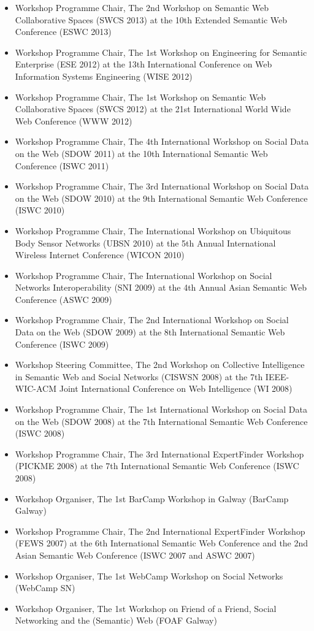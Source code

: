 \documentclass[10pt,a4paper]{res} %
\begin{document}
\begin{resume}
\begin{itemize}
\item Workshop Programme Chair, The 2nd Workshop on Semantic Web Collaborative Spaces (SWCS 2013) at the 10th Extended Semantic Web Conference (ESWC 2013)
\item Workshop Programme Chair, The 1st Workshop on Engineering for Semantic Enterprise (ESE 2012) at the 13th International Conference on Web Information Systems Engineering (WISE 2012)
\item Workshop Programme Chair, The 1st Workshop on Semantic Web Collaborative Spaces (SWCS 2012) at the 21st International World Wide Web Conference (WWW 2012)
\item Workshop Programme Chair, The 4th International Workshop on Social Data on the Web (SDOW 2011) at the 10th International Semantic Web Conference (ISWC 2011)
\item Workshop Programme Chair, The 3rd International Workshop on Social Data on the Web (SDOW 2010) at the 9th International Semantic Web Conference (ISWC 2010)
\item Workshop Programme Chair, The International Workshop on Ubiquitous Body Sensor Networks (UBSN 2010) at the 5th Annual International Wireless Internet Conference (WICON 2010)
\item Workshop Programme Chair, The International Workshop on Social Networks Interoperability (SNI 2009) at the 4th Annual Asian Semantic Web Conference (ASWC 2009)
\item Workshop Programme Chair, The 2nd International Workshop on Social Data on the Web (SDOW 2009) at the 8th International Semantic Web Conference (ISWC 2009)
\item Workshop Steering Committee, The 2nd Workshop on Collective Intelligence in Semantic Web and Social Networks (CISWSN 2008) at the 7th IEEE-WIC-ACM Joint International Conference on Web Intelligence (WI 2008)
\item Workshop Programme Chair, The 1st International Workshop on Social Data on the Web (SDOW 2008) at the 7th International Semantic Web Conference (ISWC 2008)
\item Workshop Programme Chair, The 3rd International ExpertFinder Workshop (PICKME 2008) at the 7th International Semantic Web Conference (ISWC 2008)
\item Workshop Organiser, The 1st BarCamp Workshop in Galway (BarCamp Galway)
\item Workshop Programme Chair, The 2nd International ExpertFinder Workshop (FEWS 2007) at the 6th International Semantic Web Conference and the 2nd Asian Semantic Web Conference (ISWC 2007 and ASWC 2007)
\item Workshop Organiser, The 1st WebCamp Workshop on Social Networks (WebCamp SN)
\item Workshop Organiser, The 1st Workshop on Friend of a Friend, Social Networking and the (Semantic) Web (FOAF Galway)
\end{itemize}


\end{resume}
\end{document}
